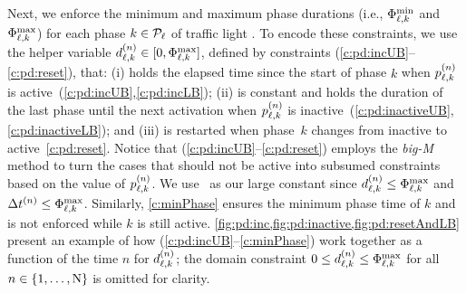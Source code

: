 Next, we enforce the minimum and maximum phase durations (i.e.,
$\PTMIN{\ell}{k}$ and $\PTMAX{\ell}{k}$) for each phase $k \in \Pset_\tl$ of
traffic light \tl.
%
To encode these constraints, we use the helper variable $\pd{\ell}{k} \in
[0,\PTMAX{\ell}{k}]$, defined by constraints
(\ref{c:pd:incUB}--\ref{c:pd:reset}), that:
%
(i) holds the elapsed time since the start of phase $k$ when $\p[n]{\ell}{k}$ is
active~(\ref{c:pd:incUB},\ref{c:pd:incLB});
%
(ii) is constant and holds the duration of the last phase until the next
activation when $\p[n]{\ell}{k}$ is
inactive~(\ref{c:pd:inactiveUB},\ref{c:pd:inactiveLB}); and
%
(iii) is restarted when phase~$k$ changes from inactive to
active~\eqref{c:pd:reset}.
%
Notice that (\ref{c:pd:incUB}--\ref{c:pd:reset}) employs the \textit{big-M}
method to turn the cases that should not be active into subsumed constraints
based on the value of $\p[n]{\tl}{k}$.
%
We use~ as our large constant since $\pd[n]{\ell}{k} \le
\PTMAX{\ell}{k}$ and $\DT[n] \le \PTMAX{\ell}{k}$.
%
Similarly, \cref{c:minPhase} ensures the minimum phase time of $k$ and is
not enforced while $k$ is still active.
%
\cref{fig:pd:inc,fig:pd:inactive,fig:pd:resetAndLB} present an example of how
(\ref{c:pd:incUB}--\ref{c:minPhase}) work together as a function of the time $n$ 
for $\pd[n]{\ell}{k}$; the domain constraint $0 \le \pd[n]{\ell}{k} \le
\PTMAX{\ell}{k}$ for all $n \in \{1,\dots,\Nn\}$ is omitted for clarity.
%
%
%
